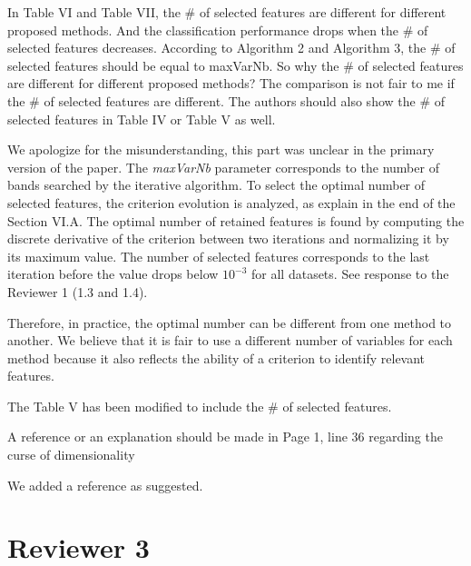 \documentclass[a4paper,10pt,DIV=16]{scrartcl}
\begin{document}
\begin{revbox}
  In Table VI and Table VII, the \# of selected features are different for different proposed methods. And the classification performance drops when the \# of selected features decreases. According to Algorithm 2 and Algorithm 3, the \# of selected features should be equal to maxVarNb. So why the \# of selected features are different for different proposed methods? The comparison is not fair to me if the \# of selected features are different. The authors should also show the \# of selected features in Table IV or Table V as well.
  \begin{resbox}
    We apologize  for the misunderstanding,  this part was  unclear in
    the primary  version of  the paper. The  \emph{maxVarNb} parameter
    corresponds  to  the number  of  bands  searched by  the  iterative
    algorithm. To select  the optimal number of  selected features, the
    criterion  evolution is  analyzed, as  explain in  the end  of the
    Section VI.A. The optimal number  of retained features is found by
    computing  the discrete  derivative  of the  criterion between  two
    iterations and normalizing it by  its maximum value. The number of
    selected  features corresponds  to the  last iteration  before the
    value drops below $10^{-3}$ for  all datasets. See response to the
    Reviewer 1 (1.3 and 1.4).

    Therefore, in practice, the optimal number can be different from one method to another.  We believe that it is fair to use a different number of variables for each method because it also reflects the ability of a criterion to identify relevant features.

    The Table V has been modified to include the \# of selected features.
  \end{resbox}
\end{revbox}

\begin{revbox}
  A reference or an explanation should be made in Page 1, line 36 regarding the curse of dimensionality
  \begin{resbox}
    We added a reference as suggested.
  \end{resbox}
\end{revbox}

\section{Reviewer 3}
\end{document}
